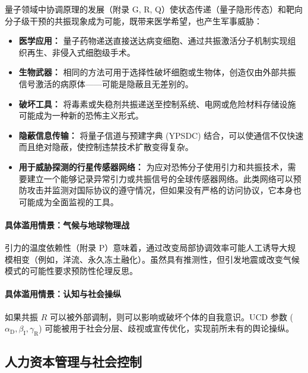 \documentclass[12pt,a4paper]{article}
\theoremstyle{remark}
\newcommand{\alD}{\alpha_{\mathrm{D}}}
\newcommand{\beI}{\beta_{\mathrm{I}}}
\newcommand{\gaR}{\gamma_{\mathrm{R}}}
\begin{document}
	量子领域中协调原理的发展（附录 G, R, Q）使状态传递（量子隐形传态）和靶向分子级干预的共振现象成为可能，既带来医学希望，也产生军事威胁：
	\begin{itemize}[leftmargin=*]
		\item \textbf{医学应用：} 量子药物递送直接送达病变细胞、通过共振激活分子机制实现组织再生、非侵入式细胞级手术。
		\item \textbf{生物武器：} 相同的方法可用于选择性破坏细胞或生物体，创造仅由外部共振信号激活的病原体——可能是隐蔽且无差别的。
		\item \textbf{破坏工具：} 将毒素或失稳剂共振递送至控制系统、电网或危险材料存储设施可能成为一种新的恐怖主义形式。
		\item \textbf{隐蔽信息传输：} 将量子信道与预建字典 (YPSDC) 结合，可以使通信不仅快速而且绝对隐蔽，使控制违禁技术扩散变得复杂。
		\item \textbf{用于威胁探测的行星传感器网络：} 为应对恐怖分子使用引力和共振技术，需要建立一个能够记录异常引力或共振信号的全球传感器网络。此类网络可以预防攻击并监测对国际协议的遵守情况，但如果没有严格的访问协议，它本身也可能成为全面监视的工具。
	\end{itemize}
	
	\paragraph{具体滥用情景：气候与地球物理战}
	引力的温度依赖性（附录 P）意味着，通过改变局部协调效率可能人工诱导大规模相变（例如，洋流、永久冻土融化）。虽然具有推测性，但引发地震或改变气候模式的可能性要求预防性伦理反思。
	
	\paragraph{具体滥用情景：认知与社会操纵}
	如果共振 \(R\) 可以被外部调制，则可以影响或破坏个体的自我意识。UCD 参数 (\(\alD,\beI,\gaR\)) 可能被用于社会分层、歧视或宣传优化，实现前所未有的舆论操纵。
	
	\subsection{人力资本管理与社会控制}
	\label{subsec:human}
	
\end{document}
